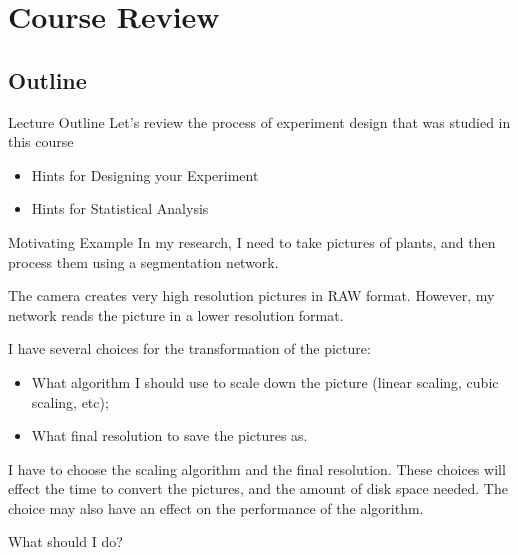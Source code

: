 
\section{Course Review}
\subsection{Outline}
\begin{frame}{Lecture Outline}
  Let's review the process of experiment design that was studied in this course

  \begin{itemize}
    \item Hints for Designing your Experiment
    \item Hints for Statistical Analysis
  \end{itemize}
\end{frame}

\begin{frame}{Motivating Example}
  In my research, I need to take pictures of plants, and then process them using a segmentation network.\bigskip

  The camera creates very high resolution pictures in RAW format. However, my network reads the picture in a lower resolution format.\bigskip

  I have several choices for the transformation of the picture:
  \begin{itemize}
    \item What algorithm I should use to scale down the picture (linear scaling, cubic scaling, etc);
    \item What final resolution to save the pictures as.
  \end{itemize}\bigskip

  I have to choose the scaling algorithm and the final resolution. These choices will effect the time to convert the pictures, and the amount of disk space needed.
  The choice may also have an effect on the performance of the algorithm.\bigskip

  What should I do?
\end{frame}




